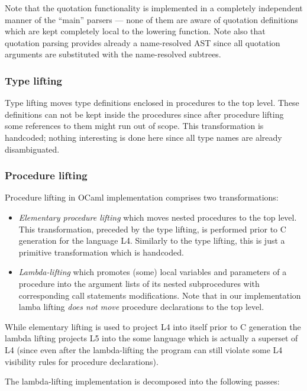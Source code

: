 Note that the quotation functionality is implemented in a completely independent manner of the ``main'' parsers ---
none of them are aware of quotation definitions which are kept completely local to the lowering function. Note also
that quotation parsing provides already a name-resolved AST since all quotation arguments are substituted with 
the name-resolved subtrees.

\subsubsection{Type lifting}

Type lifting moves type definitions enclosed in procedures to the top level. These definitions can not be
kept inside the procedures since after procedure lifting some references to them might run out
of scope. This transformation is handcoded; nothing interesting is done here since all type names are 
already disambiguated.

\subsubsection{Procedure lifting}

Procedure lifting in OCaml implementation comprises two transformations:

\begin{itemize}
\item \emph{Elementary procedure lifting} which moves nested procedures to the top level. This transformation, 
preceded by the type lifting, is performed prior to C generation for the language L4. Similarly to the type 
lifting, this is just a primitive transformation which is handcoded.

\item \emph{Lambda-lifting} which promotes (some) local variables and parameters of a procedure into the
argument lists of its nested subprocedures with corresponding call statements modifications. Note that in
our implementation lamba lifting \emph{does not move} procedure declarations to the top level.
\end{itemize}

While elementary lifting is used to project L4 into itself prior to C generation the lambda lifting
projects L5 into the some language which is actually a superset of L4 (since even after the lambda-lifting 
the program can still violate some L4 visibility rules for procedure declarations). 

The lambda-lifting implementation is decomposed into the following passes:

